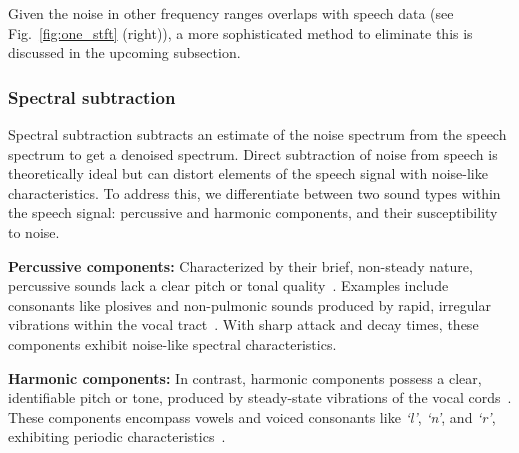Given the noise in other frequency ranges overlaps with speech data (see Fig.~\ref{fig:one_stft} (right)), a more sophisticated method to eliminate this is discussed in the upcoming subsection.


\subsubsection{\textbf{Spectral subtraction}}
\label{subsubsection:Spectral} 
Spectral subtraction subtracts an estimate of the noise spectrum from the speech spectrum to get a denoised spectrum. 
Direct subtraction of noise from speech is theoretically ideal but can distort elements of the speech signal with noise-like characteristics. 
To address this, we differentiate between two sound types within the speech signal: percussive and harmonic components, and their susceptibility to noise.


\textbf{Percussive components:} 
Characterized by their brief, non-steady nature, percussive sounds lack a clear pitch or tonal quality~\cite{ladefoged2014course}. Examples include consonants like plosives and non-pulmonic sounds produced by rapid, irregular vibrations within the vocal tract~\cite{gilman2019science}. With sharp attack and decay times, these components exhibit noise-like spectral characteristics.



\textbf{Harmonic components:} 
In contrast, harmonic components possess a clear, identifiable pitch or tone, produced by steady-state vibrations of the vocal cords~\cite{ladefoged2014course}. These components encompass vowels and voiced consonants like \textit{`l'}, \textit{`n'}, and \textit{`r'}, exhibiting periodic characteristics~\cite{moulines1995non}.


